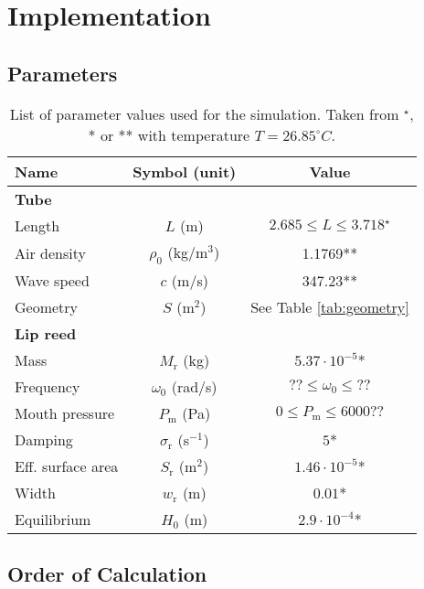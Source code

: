 \section{Implementation}

\subsection{Parameters}

\begin{table}[t]\label{tab:parameters}
    \small
    \begin{center}
    \begin{tabular}{|l|c|c|}
        \hline
        Name & Symbol (unit) & Value\\ \hline
        \multicolumn{3}{|l|}{\bf Tube}\\ \hline
        Length & $L$ (m) & $2.685\leq L \leq 3.718$$^\star$\\
        Air density &$\rho_0$ (kg/m$^3$) & 1.1769** 
        \\
        Wave speed & $c$ (m/s) & 347.23**\\
        Geometry & $S$ (m$^2$) & See Table \ref{tab:geometry} \\\hline
        \multicolumn{3}{|l|}{\bf Lip reed}\\ \hline
        Mass & $M_\text{r}$ (kg) & $5.37\cdot10^{-5}$*\\
        Frequency & $\omega_0$ (rad/s) & $?? \leq \omega_0 \leq ??$\\
        Mouth pressure & $P_\text{m}$ (Pa) & $0 \leq P_\text{m} \leq 6000??$\\
        Damping & $\sigma_\text{r}$ (s$^{-1}$) & $5$*\\
        Eff. surface area & $S_\text{r}$ (m$^{2}$) & $1.46\cdot 10^{-5}$*\\
        Width & $w_\text{r}$ (m) & $0.01$* \\
        Equilibrium & $H_0$ (m) &  $2.9 \cdot 10^{-4}$* \\\hline

    \end{tabular}
    \caption{List of parameter values used for the simulation. 
    Taken from $^\star$\cite{Smyth2011}, *\cite{Harrison2018} or **\cite{Benade1968} with temperature $T=26.85^\circ C$. }
    \end{center}
\end{table}

\subsection{Order of Calculation}